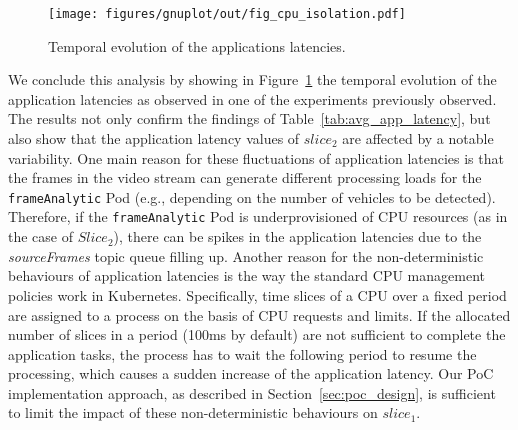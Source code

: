 %
\begin{figure}[ht]
    \centering
    \texttt{[image: figures/gnuplot/out/fig\_cpu\_isolation.pdf]}
   \caption{Temporal evolution of the applications latencies.}
    \label{fig:poc_slice_isolation_temp}
    \vspace{-0.2cm}
\end{figure}
%
We conclude this analysis by showing in Figure~\ref{fig:poc_slice_isolation_temp} the temporal evolution of the application latencies as observed in one of the experiments previously observed. The results not only confirm the findings of Table~\ref{tab:avg_app_latency}, but also show that the application latency values of $slice_2$ are affected by a notable variability. One main reason for these fluctuations of application latencies is that the frames in the video stream can generate different processing loads for the \texttt{frameAnalytic} Pod (e.g., depending on the number of vehicles to be detected). Therefore, if the \texttt{frameAnalytic} Pod is underprovisioned of CPU resources (as in the case of $Slice_2$), there can be spikes in the application latencies due to the \textit{sourceFrames} topic queue filling up. Another reason for the non-deterministic behaviours of application latencies is the way the standard CPU management policies work in Kubernetes. Specifically, time slices of a CPU over a fixed period are assigned to a process on the basis of CPU requests and limits. If the allocated number of slices in a period (100ms by default) are not sufficient to complete the application tasks, the process has to wait the following period to resume the processing, which causes a sudden increase of the application latency. Our PoC implementation approach, as described in Section~\ref{sec:poc_design}, is sufficient to limit the impact of these non-deterministic behaviours on $slice_1$. 
%
